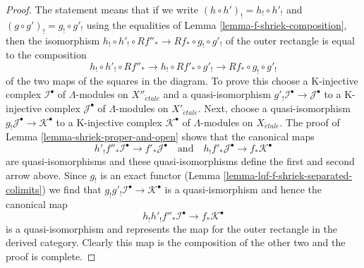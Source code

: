 \documentclass{stacks-project}
\theoremstyle{plain}
\theoremstyle{definition}
\theoremstyle{remark}
\numberwithin{equation}{subsection}
\def\etale{{\acute{e}tale}}
\begin{document}
\begin{proof}
The statement means that if we write
$(h \circ h')_! = h_! \circ h'_!$ and
$(g \circ g')_! = g_! \circ g'_!$
using the equalities of Lemma \ref{lemma-f-shriek-composition},
then the isomorphism
$h_! \circ h'_! \circ Rf''_* \to Rf_* \circ g_! \circ g'_!$
of the outer rectangle is equal to the composition
$$
h_! \circ h'_! \circ Rf''_* \to
h_! \circ Rf'_* \circ g'_! \to
Rf_* \circ g_! \circ g'_!
$$
of the two maps of the squares in the diagram. To prove this choose
a K-injective complex $\mathcal{I}^\bullet$ of $\Lambda$-modules
on $X''_\etale$ and a quasi-isomorphism
$g'_!\mathcal{I}^\bullet \to \mathcal{J}^\bullet$
to a K-injective complex $\mathcal{J}^\bullet$ of $\Lambda$-modules
on $X'_\etale$. Next, choose a quasi-isomorphism
$g_!\mathcal{J}^\bullet \to \mathcal{K}^\bullet$
to a K-injective complex $\mathcal{K}^\bullet$ of $\Lambda$-modules
on $X_\etale$.
The proof of Lemma \ref{lemma-shriek-proper-and-open} shows that the canonical
maps
$$
h'_!f''_*\mathcal{I}^\bullet \to f'_*\mathcal{J}^\bullet
\quad\text{and}\quad
h_!f'_*\mathcal{J}^\bullet \to f_*\mathcal{K}^\bullet
$$
are quasi-isomorphisms and these quasi-isomorphisms define the
first and second arrow above. Since $g_!$ is an exact functor
(Lemma \ref{lemma-lqf-f-shriek-separated-colimits})
we find that $g_!g'_!\mathcal{I}^\bullet \to \mathcal{K}^\bullet$
is a quasi-ismorphism and hence the canonical map
$$
h_!h'_!f''_*\mathcal{I}^\bullet \to f_*\mathcal{K}^\bullet
$$
is a quasi-isomorphism and represents the map for the outer
rectangle in the derived category. Clearly this map is the
composition of the other two and the proof is complete.
\end{proof}
\end{document}
